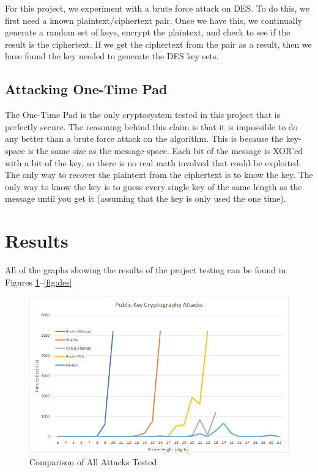 \documentclass[12pt]{report}
\begin{document}
For this project, we experiment with a brute force attack on DES. To do this, we first need a known plaintext/ciphertext pair. Once we have this, we continually
generate a random set of keys, encrypt the plaintext, and check to see if the result is the ciphertext. If we get the ciphertext from the pair as a result, then we
have found the key needed to generate the DES key sets.

\subsection{Attacking One-Time Pad}
The One-Time Pad is the only cryptosystem tested in this project that is perfectly secure. The reasoning behind this claim is that it is impossible to do any better
than a brute force attack on the algorithm. This is because the key-space is the same size as the message-space. Each bit of the message is XOR'ed with a bit of the
key, so there is no real math involved that could be exploited. The only way to recover the plaintext from the ciphertext is to know the key. The only way to know
the key is to guess every single key of the same length as the message until you get it (assuming that the key is only used the one time).

\section{Results}
\label{results}

All of the graphs showing the results of the project testing can be found in Figures \ref{fig:allattack}--\ref{fig:des}

\begin{figure}[hp!] %
    \begin{center}
        \includegraphics[width=0.85\linewidth]{AllAttack.PNG}
        \caption{Comparison of All Attacks Tested}
        \label{fig:allattack}
    \end{center}
\end{figure}
\end{document}
